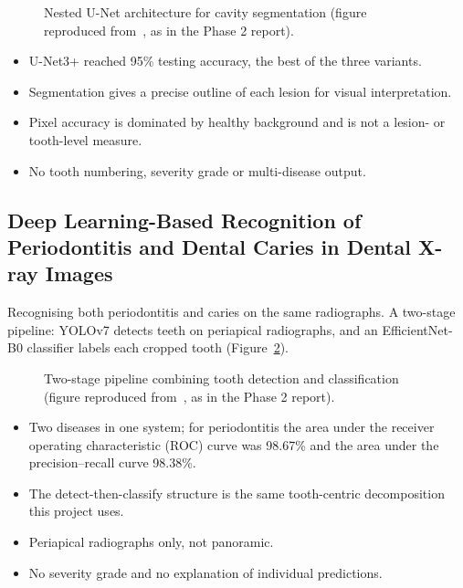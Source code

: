 \begin{figure}[!htbp]
\centering
{}
\caption[Nested U-Net architecture for cavity segmentation]{Nested U-Net architecture for cavity
segmentation (figure reproduced from~\cite{alharbi2023detection}, as in the Phase 2 report).}
\label{fig:lit-alharbi}
\end{figure}

\begin{itemize}
\item U-Net3+ reached 95\% testing accuracy, the best of the three variants.
\item Segmentation gives a precise outline of each lesion for visual interpretation.
\end{itemize}
\begin{itemize}
\item Pixel accuracy is dominated by healthy background and is not a lesion- or tooth-level measure.
\item No tooth numbering, severity grade or multi-disease output.
\end{itemize}

\subsection{Deep Learning-Based Recognition of Periodontitis and Dental Caries in Dental X-ray Images~\cite{chen2023deep}}
 Recognising both periodontitis and caries on the same radiographs.
 A two-stage pipeline: YOLOv7 detects teeth on periapical radiographs, and an
EfficientNet-B0 classifier labels each cropped tooth (Figure~\ref{fig:lit-chen23}).

\begin{figure}[!htbp]
\centering
{}
\caption[Two-stage detection and classification pipeline]{Two-stage pipeline combining tooth
detection and classification (figure reproduced from~\cite{chen2023deep}, as in the Phase 2 report).}
\label{fig:lit-chen23}
\end{figure}

\begin{itemize}
\item Two diseases in one system; for periodontitis the area under the receiver operating characteristic (ROC) curve was 98.67\% and the
  area under the precision--recall curve 98.38\%.
\item The detect-then-classify structure is the same tooth-centric decomposition this project uses.
\end{itemize}
\begin{itemize}
\item Periapical radiographs only, not panoramic.
\item No severity grade and no explanation of individual predictions.
\end{itemize}

